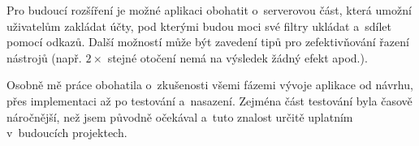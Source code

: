 Pro budoucí rozšíření je možné aplikaci obohatit o~serverovou část, která umožní uživatelům zakládat účty, pod kterými budou moci své filtry ukládat a~sdílet pomocí odkazů. Další možností může být zavedení tipů pro zefektivňování řazení nástrojů (např. $2\times$ stejné otočení nemá na výsledek žádný efekt apod.).

Osobně mě práce obohatila o~zkušenosti všemi fázemi vývoje aplikace od návrhu, přes implementaci až po testování a~nasazení. Zejména část testování byla časově náročnější, než jsem původně očekával a~tuto znalost určitě uplatním v~budoucích projektech.
